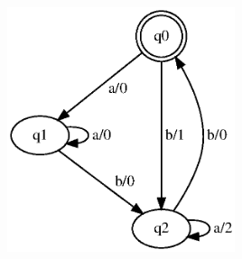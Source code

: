 \documentclass[10pt]{beamer}
\begin{document}
\begin{frame}
\begin{columns}[T]
\begin{column}{.70\textwidth}
\centering
\includegraphics[width=0.5\textwidth]{images/fsm-example01_orig}%
%
%

\end{column}
\end{columns}
\end{frame}
\end{document}
